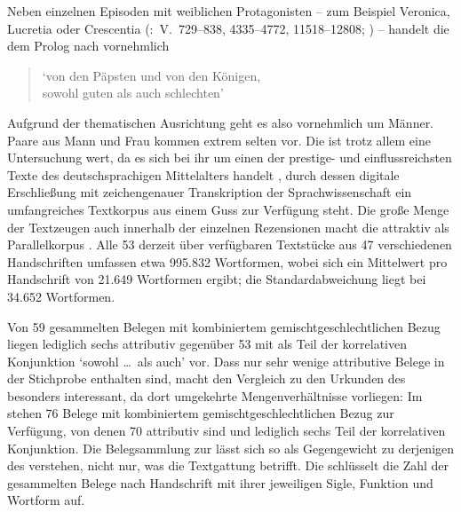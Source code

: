 Neben einzelnen Episoden mit weiblichen Protagonisten -- zum Beispiel Veronica,
Lucretia oder Crescentia (\KC:~V.~729--838, 4335--4772, 11518--12808;
\cite[vgl.][94--96, 161--169, 292--314]{schroeder1895}) -- handelt die \KC{} dem
Prolog nach vornehmlich

\blockcquote[\KC:~V.~19--20][79]{schroeder1895}[]{

	`von den Päpsten und von den Königen,\\
	sowohl guten als auch schlechten'
}

Aufgrund der thematischen Ausrichtung geht es also vornehmlich um Männer. Paare
aus Mann und Frau kommen extrem selten vor. Die \KC{} ist trotz allem eine
Untersuchung wert, da es sich bei ihr um einen der prestige- und
einflussreichsten Texte des deutschsprachigen Mittelalters handelt
\autocite[93]{wolf2008}, durch dessen digitale Erschließung mit zeichengenauer
Transkription \autocite{kcdigital} der Sprachwissenschaft ein umfangreiches
Textkorpus aus einem Guss zur Verfügung steht. Die große Menge der Textzeugen
auch innerhalb der einzelnen Rezensionen macht die \KC{} attraktiv als
Parallelkorpus \autocite{cysouwwaelchli2007}. Alle 53 derzeit über
 verfügbaren Textstücke aus 47 verschiedenen Handschriften
umfassen etwa 995.832 Wortformen, wobei sich ein Mittelwert pro Handschrift von
21.649 Wortformen ergibt; die Standardabweichung liegt bei 34.652 Wortformen.

Von 59 gesammelten Belegen mit kombiniertem gemischtgeschlechtlichen Bezug
liegen lediglich sechs attributiv gegenüber 53 mit  als Teil der
korrelativen Konjunktion  `sowohl \dots\ als auch' vor.
Dass nur sehr wenige attributive Belege in der Stichprobe enthalten sind, macht
den Vergleich zu den Urkunden des \CAO{} besonders interessant, da dort
umgekehrte Mengenverhältnisse vorliegen: Im \CAO{} stehen 76 Belege mit
kombiniertem gemischtgeschlechtlichen Bezug zur Verfügung, von denen 70
attributiv sind und lediglich sechs Teil der korrelativen Konjunktion. Die
Belegsammlung zur \KC{} lässt sich so als Gegengewicht zu derjenigen des \CAO{}
verstehen, nicht nur, was die Textgattung betrifft. Die 
schlüsselt die Zahl der gesammelten Belege nach Handschrift mit ihrer
jeweiligen Sigle, Funktion und Wortform auf.

